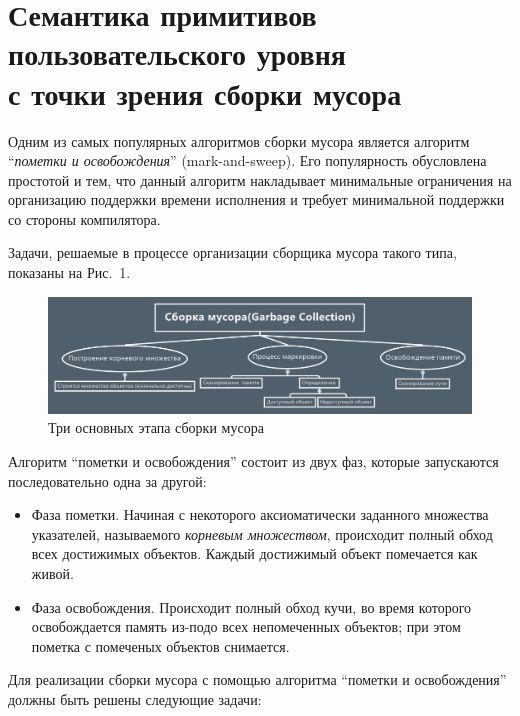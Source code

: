 \section{Семантика примитивов\\
пользовательского уровня\\
с точки зрения сборки мусора}

Одним из самых популярных алгоритмов сборки мусора является  алгоритм ``\emph{пометки и 
освобождения}'' (mark-and-sweep). Его популярность обусловлена простотой и тем, что 
данный алгоритм накладывает минимальные ограничения на организацию поддержки времени
исполнения и требует минимальной поддержки со стороны компилятора. 

Задачи, решаемые в процессе организации сборщика мусора такого типа, показаны на Рис.~1.

\begin{figure}[h!]
	\centering
	\includegraphics[width=500pt]{picture1.jpg}
	\caption{Три основных этапа сборки мусора}
	\centering
\end{figure}

Алгоритм ``пометки и освобождения'' состоит из двух фаз, которые запускаются последовательно
одна за другой:

\begin{itemize}
\item Фаза пометки. Начиная с некоторого аксиоматически заданного множества указателей, называемого
\emph{корневым множеством}, происходит полный обход всех достижимых объектов. Каждый достижимый
объект помечается как живой.
\item Фаза освобождения. Происходит полный обход кучи, во время которого освобождается память
из-подо всех непомеченных объектов; при этом пометка с помеченых объектов снимается.
\end{itemize}

Для реализации сборки мусора с помощью алгоритма ``пометки и освобождения'' должны быть решены
следующие задачи:


